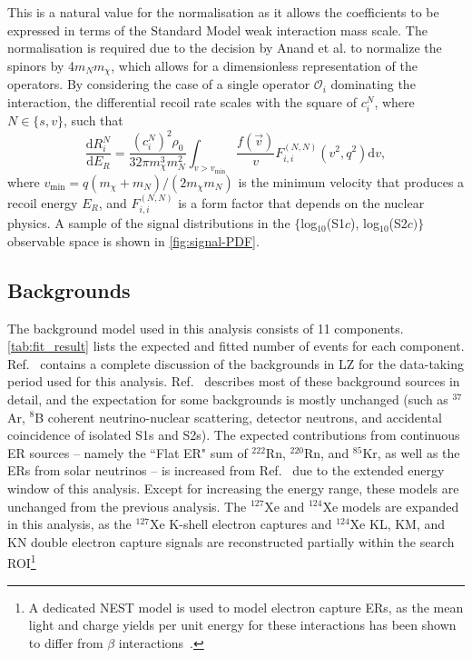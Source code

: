 \documentclass[reprint, showpacs,
preprintnumbers,
amsmath,amssymb,
aps, floatfix,
superscriptaddress,
prd, nofootinbib]{revtex4-1}
\begin{document}
This is a natural value for the normalisation as it allows the coefficients to be expressed in terms of the Standard Model weak interaction mass scale.
The normalisation is required due to the decision by Anand et al. to normalize the spinors by 4$m_N m_\chi$, 
which allows for a dimensionless representation of the operators. 
By considering the case of a single operator $\mathcal{O}_i$ dominating the interaction, the differential recoil rate scales with the square of $c_i^N$, where $N \in \{s, v\}$, such that
\begin{equation}\label{eq:spectrumReduced}
     \frac{\mathrm{d} R_i^N}{\mathrm{d} E_{R}}=\frac{(c_{i}^{N})^2 \rho_{0}}{32 \pi m_{\chi}^{3} m_{N}^{2}} \int_{v>v_\text{min}} \frac{f(\vec{v})}{v} F_{i, i}^{\left(N, N\right)}\left(v^2, q^{2}\right) \mathrm{d}{v},
\end{equation}
where $v_\text{min} = q(m_\chi + m_N) / (2 m_\chi m_N)$ is the minimum velocity that produces a recoil energy $E_R$, and $F_{i,i}^{(N, N)}$ is a form factor that depends on the nuclear physics. 
A sample of the signal distributions in the $\{$log$_{10}$(S1$c$), log$_{10}$(S2$c)\}$ observable space is shown in \autoref{fig:signal-PDF}.

\subsection{\label{subsec:bg}Backgrounds}
\par
The background model used in this analysis consists of 11 components.
\autoref{tab:fit_result} lists the expected and fitted number of events for each component.
Ref.~\cite{LZ:sr1backgrounds_2022} contains a complete discussion of the backgrounds in LZ for the data-taking period used for this analysis.
Ref.~\cite{LZ:SR1WS_2022} describes most of these background sources in detail, and the expectation for some backgrounds is mostly unchanged (such as ${}^{37}$Ar, ${}^{8}$B coherent neutrino-nuclear scattering, detector neutrons, and accidental coincidence of isolated S1s and S2s). 
The expected contributions from continuous ER sources -- namely the ``Flat ER" sum of ${}^{222}$Rn, ${}^{220}$Rn, and ${}^{85}$Kr, as well as the ERs from solar neutrinos -- is increased from Ref.~\cite{LZ:SR1WS_2022} due to the extended energy window of this analysis. 
Except for increasing the energy range, these models are unchanged from the previous analysis. 
The ${}^{127}$Xe and ${}^{124}$Xe models are expanded in this analysis, as the ${}^{127}$Xe K-shell electron captures and ${}^{124}$Xe KL, KM, and KN double electron capture signals are reconstructed partially within the search ROI\footnote{A dedicated NEST model is used to model electron capture ERs, as the mean light and charge yields per unit energy for these interactions has been shown to differ from $\beta$ interactions~\cite{XELDA_Lshell_EC}.}
\end{document}
